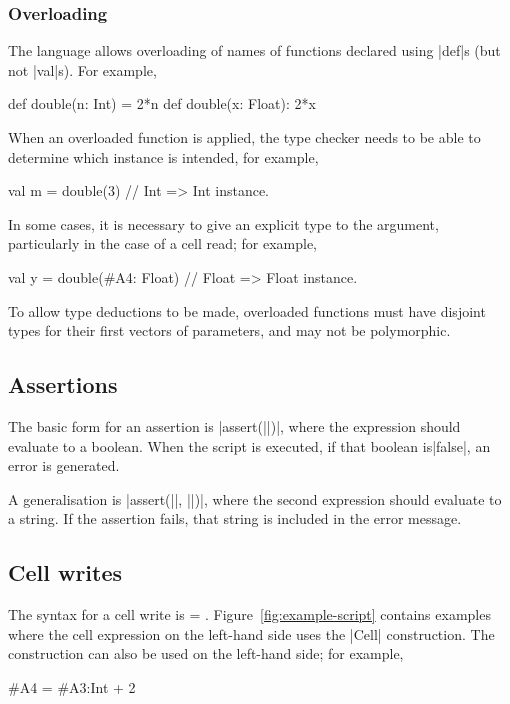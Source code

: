 
\subsubsection{Overloading}

The language allows overloading of names of functions declared using |def|s
(but not |val|s).  For example,
\begin{scala}
def double(n: Int) = 2*n
def double(x: Float): 2*x
\end{scala}
%
When an overloaded function is applied, the type checker needs to be able to
determine which instance is intended, for example,
\begin{scala}
val m = double(3) // Int => Int instance.
\end{scala}
%
In some cases, it is necessary to give an explicit type to the argument,
particularly in the case of a cell read; for example,
\begin{scala}
val y = double(#A4: Float) // Float => Float instance.
\end{scala}
%
To allow type deductions to be made, overloaded functions must have disjoint
types for their first vectors of parameters, and may not be polymorphic. 

\subsection{Assertions}

The basic form for an assertion is |assert(||)|, where
the expression should evaluate to a boolean.  When the script is executed, if
that boolean is|false|, an error is generated.

A generalisation is |assert(||, ||)|,
where the second expression should evaluate to a string.  If the assertion
fails, that string is included in the error message. 


\subsection{Cell writes}
\label{ssec:cell-writes}

The syntax for a cell write is  = .
Figure~\ref{fig:example-script} contains examples where the cell expression on
the left-hand side uses the |Cell| construction.  The \SCALA{\#} construction
can also be used on the left-hand side; for example,
\begin{scala}
#A4 = #A3:Int + 2
\end{scala}

